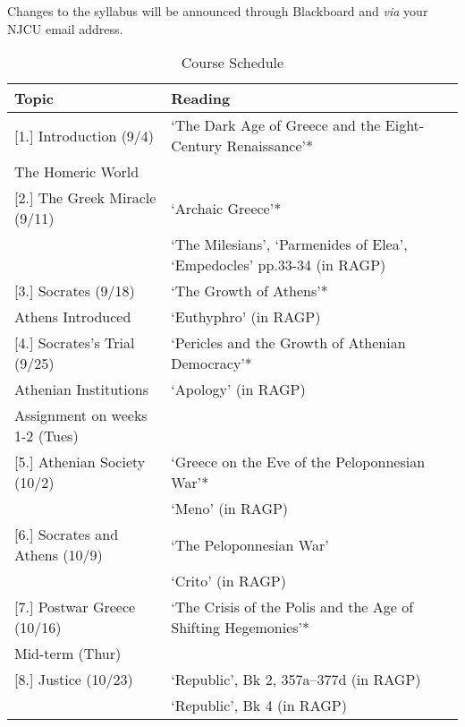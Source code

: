 \documentclass[article,oneside]{memoir}
\begin{document}
 Changes to the syllabus will be announced through Blackboard and \emph{via} your NJCU email address.  

\begin{center}
\begin{longtable}{p{4.75cm}p{8.5cm}}
 
  \caption{Course Schedule} \\
  \toprule
  \textbf{Topic}   & \textbf{Reading} \\
  \midrule

  
[1.] Introduction (9/4) 			&  `The Dark Age of Greece and the Eight-Century Renaissance'* \\ 
The Homeric World				&     \\ [1\baselineskip] \midrule
	
[2.]  The Greek Miracle  (9/11)		 & `Archaic Greece'* \\
							 &`The Milesians', `Parmenides of Elea', `Empedocles' pp.33-34  (in RAGP)  \\ [1\baselineskip] \midrule

[3.] Socrates (9/18)	  			& `The Growth of Athens'*\\
Athens Introduced				&`Euthyphro'  (in RAGP)  \\ [1\baselineskip] \midrule

[4.] Socrates's Trial (9/25)			& `Pericles and the Growth of Athenian Democracy'*   \\ 
Athenian Institutions				& `Apology' (in RAGP)	\\
Assignment on weeks 1-2 (Tues)	& \\[1\baselineskip] \midrule

[5.] Athenian Society (10/2)		&  `Greece on the Eve of the Peloponnesian War'* \\
						    	&  `Meno' (in RAGP)	 \\ [1\baselineskip] \midrule


[6.] Socrates and Athens (10/9)		& `The Peloponnesian War' \\
							& `Crito' (in RAGP) \\ [1\baselineskip]  \midrule

[7.] Postwar Greece	(10/16)		&  `The Crisis of the Polis and the Age of Shifting Hegemonies'*  	\\ 
Mid-term (Thur)					& 	\\ [1\baselineskip] \midrule

[8.] Justice	(10/23)			&  `Republic', Bk 2, 357a--377d (in RAGP) \\
							&  `Republic', Bk 4 (in RAGP)  \\ [1\baselineskip] \midrule


\end{longtable}
\end{center}
\end{document}
